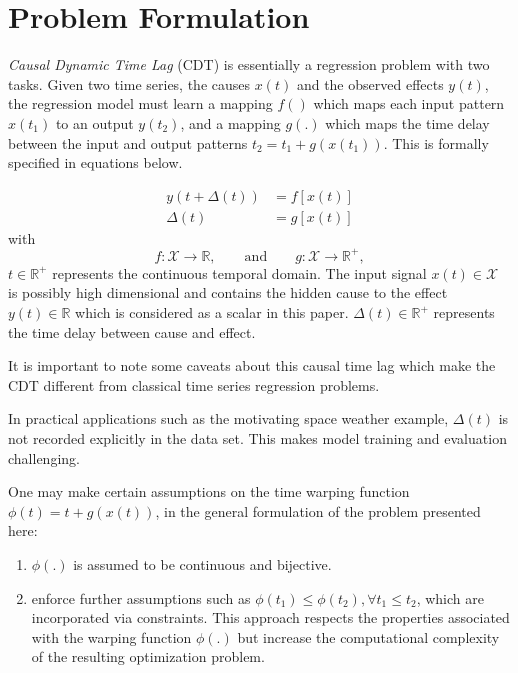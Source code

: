 \documentclass[twoside]{article}
\begin{document}
\section{Problem Formulation}\label{sec:formulation}

\emph{Causal Dynamic Time Lag} (CDT) is essentially a regression problem with two tasks. Given two time series, the causes $x(t)$ and the observed effects $y(t)$, the regression model must learn a mapping $f()$ which maps each input pattern $x(t_1)$ to an output $y(t_2)$, and a mapping $g(.)$ which maps the time delay between the input and output patterns $t_2 = t_1 + g(x(t_1))$. This is formally specified in equations below.

\begin{align}
y(t + \Delta(t)) & = f[x(t)]\label{eq:pb1}\\
\Delta(t) & = g[x(t)]\label{eq:pb2} 
\end{align}
with
\[
f: \mathcal{X}  \rightarrow \mathbb{R},\qquad\text{and}\qquad
g: \mathcal{X}  \rightarrow \mathbb{R}^{+},
\]
$t \in \mathbb{R}^{+}$ represents the continuous temporal domain. The input signal $x(t)\in \mathcal{X}$ is possibly high dimensional and contains the hidden cause to the effect $y(t)\in\mathbb{R}$ which is considered as a scalar in this paper. $\Delta(t)\in \mathbb{R}^+$ represents the time delay between cause and effect.

It is important to note some caveats about this causal time lag which make the CDT different from classical time series regression problems.

In practical applications such as the motivating space weather example, $\Delta(t)$ is not recorded explicitly in the data set. This makes model training and evaluation challenging.

One may make certain assumptions on the time warping function $\phi(t) = t + g(x(t))$, in the general formulation of the problem presented here: 

\begin{enumerate}
    \item $\phi(.)$ is assumed to be continuous and bijective.
    \item \cite{ZHOU2006195} enforce further assumptions such as $\phi(t_1) \leq \phi(t_2), \forall t_1 \leq t_2$, which are incorporated via constraints. This approach respects the properties associated with the warping function $\phi(.)$ but increase the computational complexity of the resulting optimization problem.
\end{enumerate}
\end{document}
